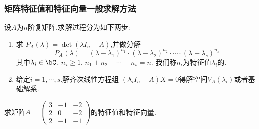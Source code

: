 \begin{frame}\frametitle{矩阵特征值和特征向量一般求解方法}
设$A$为$n$阶复矩阵.求解过程分为如下两步:
\pp
\begin{enumerate}
\item 求 $P_A(\lambda)=\det(\lambda I_n - A)$,并做分解
\[P_A(\lambda) = (\lambda-\lambda_1)^{n_1}\cdot(\lambda-\lambda_2)^{n_2}\cdot\cdots\cdot(\lambda-\lambda_s)^{n_s}\]
其中$\lambda_i\in\bC$, $n_i\geq1$, $n_1+n_2+\cdots+n_s=n$.
\pp
我们称$n_i$为特征值$\lambda_i$的.
\pp
\item 给定$i=1,\cdots,s$.解齐次线性方程组 $(\lambda_iI_n-A)X=0$得解空间$V_A(\lambda_i)$或者基础解系.
\end{enumerate}
\pp
\begin{example}
求矩阵$A=\begin{pmatrix}3&-1&-2\\2&0&-2\\2&-1&-1\end{pmatrix}$的特征值和特征向量.
\end{example}
\pp
{}
\end{frame}






